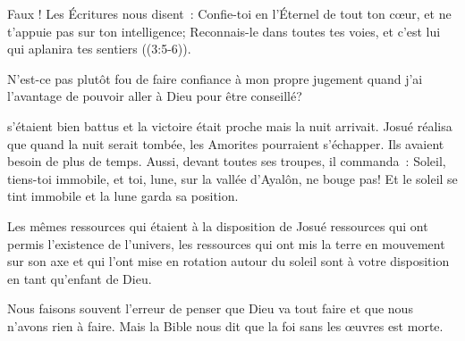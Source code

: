 Faux ! Les Écritures nous disent~:
 \og Confie-toi en l'Éternel de tout ton cœur,
 et ne t'appuie pas sur ton intelligence;
 Reconnais-le dans toutes tes voies,
 et c'est lui qui aplanira tes sentiers \fg{} ((3:5-6)).


N'est-ce pas plutôt fou de faire confiance à mon propre jugement
 quand j'ai l'avantage de pouvoir aller à Dieu pour être conseillé? 

\dvrule






 s'étaient bien battus
 et la victoire était proche \ocadr mais la nuit arrivait.
 Josué réalisa que quand la nuit serait tombée,
 les Amorites pourraient s'échapper. Ils avaient besoin de plus de temps.
 Aussi, devant toutes ses troupes, il commanda~:
 \og Soleil, tiens-toi immobile, et toi, lune, sur la vallée d'Ayalôn,
 ne bouge pas! \fg{}
 Et le soleil se tint immobile et la lune garda sa position.

Les mêmes ressources qui étaient à la disposition de Josué
 \ocadr ressources qui ont permis l'existence de l'univers,
 les ressources qui ont mis la terre en mouvement sur son axe
 et qui l'ont mise en rotation autour du soleil \fcadr{}
 sont à votre disposition en tant qu'enfant de Dieu.

Nous faisons souvent l'erreur de penser que Dieu va tout faire
 et que nous n'avons rien à faire.
 Mais la Bible nous dit que la foi sans les œuvres est morte.


